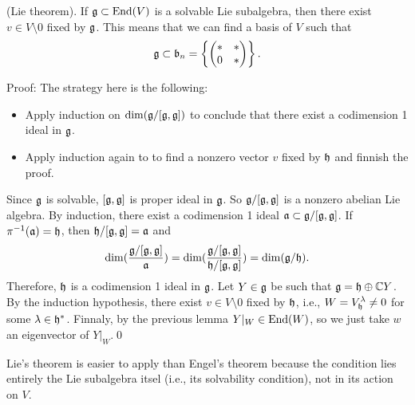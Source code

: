 \begin{dang}
    \begin{theorem}
        (Lie theorem).
        If $\mathfrak{g}\subset\text{End}(V)$ is a solvable Lie subalgebra, then there exist $v\in V\setminus0$ fixed by $\mathfrak{g}$. 
        This means that we can find a basis of $V$ such that 
        \begin{equation}
            \mathfrak{g}\subset \mathfrak{b}_n=\left\{\begin{pmatrix}
                *&*\\0&*
            \end{pmatrix}\right\}.
        \end{equation}
    \end{theorem}
\end{dang}
Proof: The strategy here is the following:
\begin{itemize}
    \item Apply induction on $\dim(\mathfrak{g}/[\mathfrak{g},\mathfrak{g}])$ to conclude that there exist a codimension 1 ideal in $\mathfrak{g}$.
    \item Apply induction again to to find a nonzero vector $v$ fixed by $\mathfrak{h}$ and finnish the proof.
\end{itemize}

Since $\mathfrak{g}$ is solvable, $[\mathfrak{g},\mathfrak{g}]$ is proper ideal in $\mathfrak{g}$. So $\mathfrak{g}/[\mathfrak{g},\mathfrak{g}]$ is a nonzero 
abelian Lie algebra. By induction, there exist a codimension 1 ideal $\mathfrak{a}\subset \mathfrak{g}/[\mathfrak{g},\mathfrak{g}]$. If 
$\pi^{-1}(\mathfrak{a})=\mathfrak{h}$, then $\mathfrak{h}/[\mathfrak{g},\mathfrak{g}]= \mathfrak{a}$ and 
\begin{equation}
    \dim(\frac{\mathfrak{g}/[\mathfrak{g},\mathfrak{g}]}{\mathfrak{a}})
    =\dim(\frac{\mathfrak{g}/[\mathfrak{g},\mathfrak{g}]}{\mathfrak{h}/[\mathfrak{g},\mathfrak{g}]})=\dim(\mathfrak{g}/\mathfrak{h}).
\end{equation}
Therefore, $\mathfrak{h}$ is a codimension 1 ideal in $\mathfrak{g}$. Let $Y\in\mathfrak{g}$ be such that $\mathfrak{g}=\mathfrak{h}\oplus\mathbb{C} Y$. 
By the induction hypothesis, there exist $v\in V\setminus0$ fixed by $\mathfrak{h}$, i.e., $W=V_{\mathfrak{h}}^\lambda\neq0$ 
for some $\lambda\in\mathfrak{h}^*$. Finnaly, by the previous lemma $Y|_W\in\text{End}(W)$, so we just take $w$ an eigenvector of 
$Y|_W$.\qed

\begin{dang}
    \begin{remark}
        Lie's theorem is easier to apply than Engel's theorem because the condition lies entirely the 
        Lie subalgebra itsel (i.e., its solvability condition), not in its action on $V$.
    \end{remark}
\end{dang}



